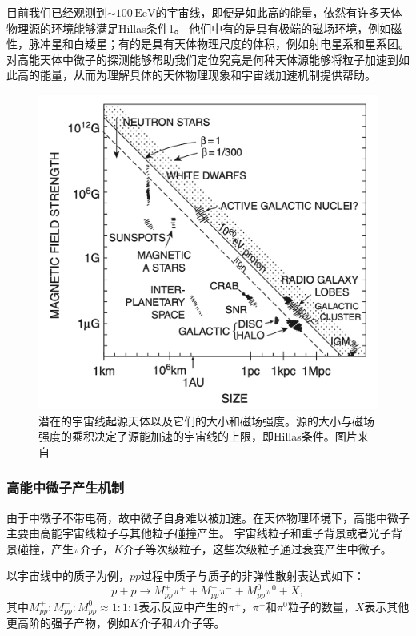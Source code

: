 目前我们已经观测到$\sim 100\,\mathrm{EeV}$的宇宙线，即便是如此高的能量，依然有许多天体物理源的环境能够满足Hillas条件\ref{fig:Hillas_limit}。
他们中有的是具有极端的磁场环境，例如磁性，脉冲星和白矮星；有的是具有天体物理尺度的体积，例如射电星系和星系团。
对高能天体中微子的探测能够帮助我们定位究竟是何种天体源能够将粒子加速到如此高的能量，从而为理解具体的天体物理现象和宇宙线加速机制提供帮助。

\begin{figure}[htb]
    \centering
    \includegraphics[width=0.8\linewidth]{img/Hillas_limit.png}
    \caption{潜在的宇宙线起源天体以及它们的大小和磁场强度。源的大小与磁场强度的乘积决定了源能加速的宇宙线的上限，即Hillas条件。图片来自\parencite{Gaisser:2016}}
    \label{fig:Hillas_limit}
\end{figure}

\subsubsection{高能中微子产生机制}
\label{subsubsec:neutrino_production}

由于中微子不带电荷，故中微子自身难以被加速。在天体物理环境下，高能中微子主要由高能宇宙线粒子与其他粒子碰撞产生。
宇宙线粒子和重子背景或者光子背景碰撞，产生$\pi$介子，$K$介子等次级粒子，这些次级粒子通过衰变产生中微子。

以宇宙线中的质子为例，$pp$过程中质子与质子的非弹性散射表达式如下：
\begin{equation}
    p+p \rightarrow M_{p p}^{+} \pi^{+}+M_{p p}^{-} \pi^{-}+M_{p p}^0 \pi^0 + X ,
    \label{eq:pp_interaction}
\end{equation}
其中$M_{p p}^{+}: M_{p p}^{-}: M_{p p}^0 \approx 1: 1: 1$表示反应中产生的$\pi^{+}$，$\pi^{-}$和$\pi^{0}$粒子的数量，$X$表示其他更高阶的强子产物，例如$K$介子和$\Lambda$介子等。

